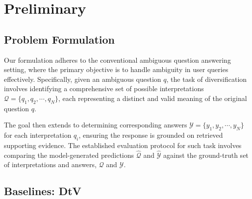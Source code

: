 \section{Preliminary}


\subsection{Problem Formulation}
\label{sec:problem_formuation}




Our formulation adheres to the conventional ambiguous question answering setting, where the primary objective is to handle ambiguity in user queries effectively. Specifically, given an ambiguous question \( q \), the task of diversification involves identifying a comprehensive set of possible interpretations \( \mathcal{Q} = \{q_1, q_2, \cdots, q_N\} \), each representing a distinct and valid meaning of the original question $q$. 

The goal then extends to determining corresponding answers \( \mathcal{Y} = \{ y_1, y_2, \cdots, y_N \} \) for each interpretation \( q_i \), ensuring the response is grounded on retrieved supporting evidence.
The established evaluation protocol for such task involves comparing the model-generated predictions \( \hat{\mathcal{Q}} \) and \( \hat{\mathcal{Y}} \) against the ground-truth set of interpretations and answers, \( \mathcal{Q} \) and \( \mathcal{Y} \). 



\subsection{Baselines: DtV}
\label{subsec:diva}

